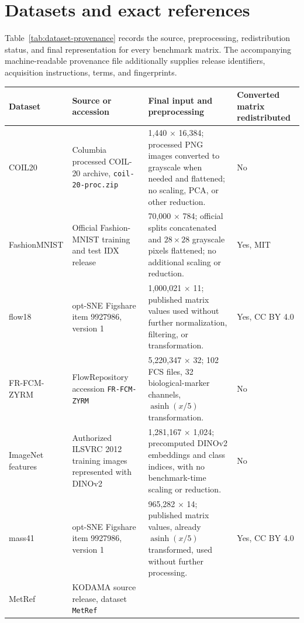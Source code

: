 \documentclass[11pt]{article}
\newcommand{\code}[1]{\texttt{#1}}
\newcommand{\pkg}[1]{\textsf{#1}}
\begin{document}
\section{Datasets and exact references}

Table~\ref{tab:dataset-provenance} records the source, preprocessing,
redistribution status, and final representation for every benchmark matrix.
The accompanying machine-readable provenance file additionally supplies
release identifiers, acquisition instructions, terms, and fingerprints.

\begin{table}[H]
\centering
\scriptsize

\setlength{\tabcolsep}{3pt}
\begin{tabularx}{\textwidth}{@{}p{}p{}X p{}@{}}
\toprule
Dataset & Source or accession & Final input and preprocessing & Converted matrix redistributed \\
\midrule
COIL20 & Columbia processed COIL-20 archive, \code{coil-20-proc.zip} \citep{Nene1996} &
1,440 $\times$ 16,384; processed PNG images converted to grayscale when needed and flattened; no scaling, PCA, or other reduction. & No \\
FashionMNIST & Official Fashion-MNIST training and test IDX release \citep{Xiao2017} &
70,000 $\times$ 784; official splits concatenated and $28\times28$ grayscale pixels flattened; no additional scaling or reduction. & Yes, MIT \\
flow18 & opt-SNE Figshare item 9927986, version 1 \citep{Belkina2019} &
1,000,021 $\times$ 11; published matrix values used without further normalization, filtering, or transformation. & Yes, CC BY 4.0 \\
FR-FCM-ZYRM & FlowRepository accession \code{FR-FCM-ZYRM} \citep{VanUnen2017} &
5,220,347 $\times$ 32; 102 FCS files, 32 biological-marker channels, $\operatorname{asinh}(x/5)$ transformation. & No \\
ImageNet features & Authorized ILSVRC 2012 training images represented with DINOv2 \citep{Russakovsky2015,Oquab2024} &
1,281,167 $\times$ 1,024; precomputed DINOv2 embeddings and class indices, with no benchmark-time scaling or reduction. & No \\
mass41 & opt-SNE Figshare item 9927986, version 1 \citep{Belkina2019} &
965,282 $\times$ 14; published matrix values, already $\operatorname{asinh}(x/5)$ transformed, used without further processing. & Yes, CC BY 4.0 \\
MetRef & \pkg{KODAMA} source release, dataset \code{MetRef} \citep{Cacciatore2014} &

\end{tabularx}
\end{table}
\end{document}
